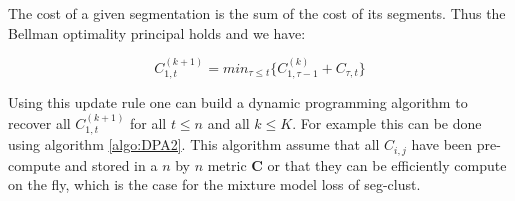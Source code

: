 \documentclass[a4paper,12pt,twoside]{report}
\begin{document}
The cost of a given segmentation is the sum of the cost of its segments. 
Thus the Bellman optimality principal holds and we have:

$$ C_{1, t}^{(k+1)} = min_{\tau \leq t} \{ C_{1, \tau -1}^{(k)}  + C_{\tau, t} \} $$

Using this update rule one can build a dynamic programming algorithm to recover all $ C_{1, t}^{(k+1)}$ for all $t \leq n$ and all $k \leq K$.
For example this can be done using algorithm \ref{algo:DPA2}. This algorithm assume that all $C_{i, j}$ have been pre-compute and stored in 
a $n$ by $n$ metric $\mathbf{C}$ or that they can be efficiently compute on the fly, which is the case for the mixture model loss of seg-clust. 
\end{document}
